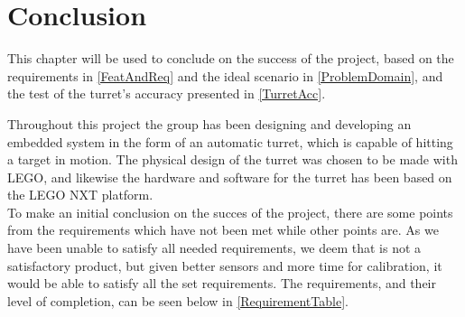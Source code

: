 \chapter{Conclusion}\label{FinalConclusion}
This chapter will be used to conclude on the success of the project, based on
the requirements in \autoref{FeatAndReq} and the ideal scenario in \autoref{ProblemDomain},
and the test of the turret's accuracy presented in \autoref{TurretAcc}. \nl

Throughout this project the group has been designing and developing an embedded
system in the form of an automatic turret, which is capable of hitting a target
in motion. The physical design of the turret was chosen to be made with LEGO,
and likewise the hardware and software for the turret has been based on the LEGO
NXT platform.\\
To make an initial conclusion on the succes of the project, there are some
points from the requirements which have not been met while other points are.
As we have been unable to satisfy all needed requirements, we deem that \name
is not a satisfactory product, but given better sensors and more time for
calibration, it would be able to satisfy all the set requirements. 
The requirements, and their level of completion, can be
seen below in \autoref{RequirementTable}.

